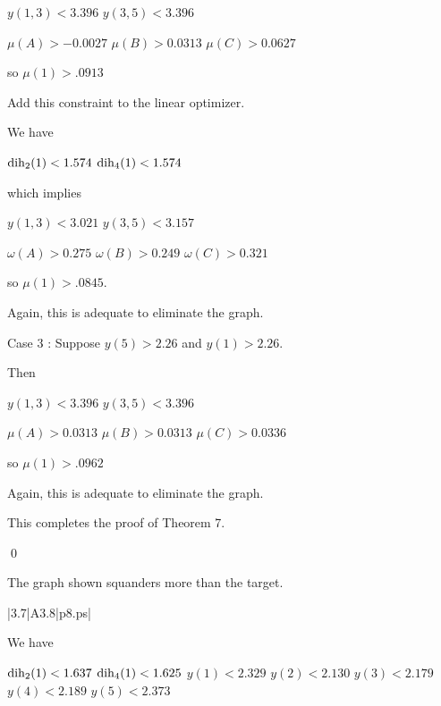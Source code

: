 $y(1,3)<3.396$ \newline
$y(3,5)<3.396$ \newline

$\mu(A)>-0.0027$ \newline
$\mu(B)>0.0313$ \newline
$\mu(C)>0.0627$ \newline

so $\mu(1)>.0913$

Add this constraint to the linear optimizer.

We have

$\operatorname{dih}_2(1)<1.574$ \newline
$\operatorname{dih}_4(1)<1.574$ \newline

which implies

$y(1,3)<3.021$
$y(3,5)<3.157$

$\omega(A)>0.275$
$\omega(B)>0.249$
$\omega(C)>0.321$

so $\mu(1)>.0845.$

Again, this is adequate to eliminate the graph.

Case 3 : Suppose $y(5)>2.26$ and $y(1)>2.26.$


Then

$y(1,3)<3.396$ \newline
$y(3,5)<3.396$ \newline

$\mu(A)>0.0313$ \newline
$\mu(B)>0.0313$ \newline
$\mu(C)>0.0336$ \newline

so $\mu(1)>.0962$

Again, this is adequate to eliminate the graph.


This completes the proof of Theorem 7.

\qed


\bigskip



 The graph shown 
squanders more than the target.  \endproclaim

\gram|3.7|A3.8|p8.ps|  %

We have 

$\operatorname{dih}_2(1) < 1.637$ \newline
$\operatorname{dih}_4(1) < 1.625$ \newline
$y(1)<2.329$ \newline
$y(2)<2.130$ \newline
$y(3)<2.179$ \newline
$y(4)<2.189$ \newline
$y(5)<2.373$ \newline

